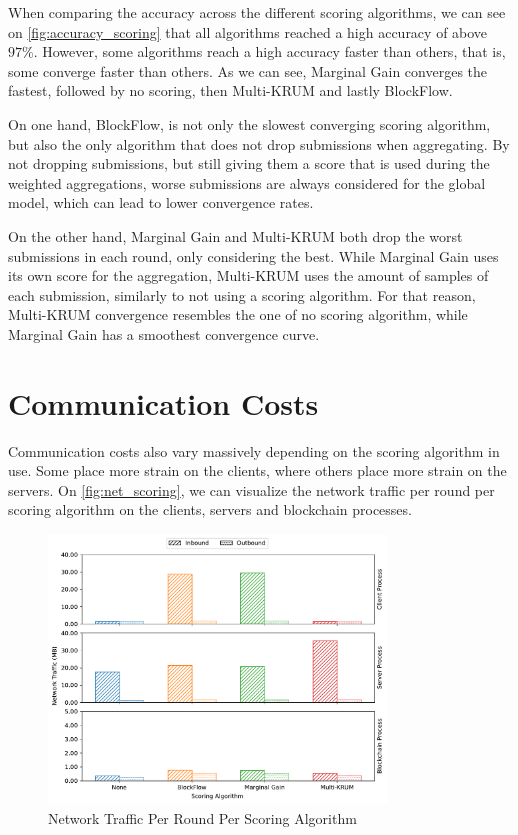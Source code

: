 When comparing the accuracy across the different scoring algorithms, we can see on \autoref{fig:accuracy_scoring} that all algorithms reached a high accuracy of above $97\%$. However, some algorithms reach a high accuracy faster than others, that is, some converge faster than others. As we can see, Marginal Gain converges the fastest, followed by no scoring, then Multi-KRUM and lastly BlockFlow.

On one hand, BlockFlow, is not only the slowest converging scoring algorithm, but also the only algorithm that does not drop submissions when aggregating. By not dropping submissions, but still giving them a score that is used during the weighted aggregations, worse submissions are always considered for the global model, which can lead to lower convergence rates. 

On the other hand, Marginal Gain and Multi-KRUM both drop the worst submissions in each round, only considering the best. While Marginal Gain uses its own score for the aggregation, Multi-KRUM uses the amount of samples of each submission, similarly to not using a scoring algorithm. For that reason, Multi-KRUM convergence resembles the one of no scoring algorithm, while Marginal Gain has a smoothest convergence curve.

\section{Communication Costs}

Communication costs also vary massively depending on the scoring algorithm in use. Some place more strain on the clients, where others place more strain on the servers. On \autoref{fig:net_scoring}, we can visualize the network traffic per round per scoring algorithm on the clients, servers and blockchain processes.

\begin{figure}[!ht]
    \centering
    \centering
    \includegraphics[width=0.8\textwidth]{graphics/scoring/net.pdf}
    \caption{Network Traffic Per Round Per Scoring Algorithm}
    \label{fig:net_scoring}
\end{figure}


